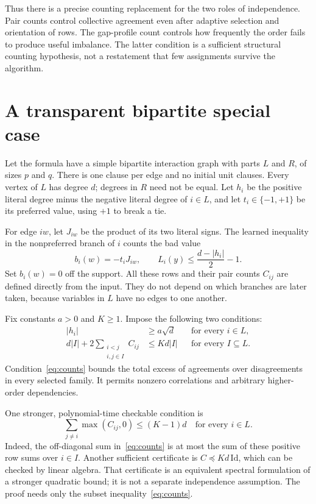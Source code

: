 \documentclass[11pt,a4paper]{article}
\begin{document}
Thus there is a precise counting replacement for the two roles of
independence. Pair counts control collective agreement even after
adaptive selection and orientation of rows. The gap-profile count
controls how frequently the order fails to produce useful imbalance.
The latter condition is a sufficient structural counting hypothesis,
not a restatement that few assignments survive the algorithm.

\section{A transparent bipartite special case}

Let the formula have a simple bipartite interaction graph with parts
$L$ and $R$, of sizes $p$ and $q$. There is one clause per edge and no
initial unit clauses. Every vertex of $L$ has degree $d$; degrees in
$R$ need not be equal. Let $h_i$ be the positive literal degree minus
the negative literal degree of $i\in L$, and let $t_i\in\{-1,+1\}$
be its preferred value, using $+1$ to break a tie.

For edge $iw$, let $J_{iw}$ be the product of its two literal signs.
The learned inequality in the nonpreferred branch of $i$ counts the
bad value
\begin{equation}
 b_i(w)=-t_iJ_{iw},\qquad
 L_i(y)\le\frac{d-|h_i|}{2}-1.                       \label{eq:learn}
\end{equation}
Set $b_i(w)=0$ off the support. All these rows and their pair counts
$C_{ij}$ are defined directly from the input. They do not depend on
which branches are later taken, because variables in $L$ have no edges
to one another.

Fix constants $a>0$ and $K\ge1$. Impose the following two conditions:
\begin{align}
 |h_i|&\ge a\sqrt d &&\text{for every }i\in L,       \label{eq:gap}\\
 d|I|+2\sum_{\substack{i<j\\i,j\in I}}C_{ij}
      &\le Kd|I| &&\text{for every }I\subseteq L.   \label{eq:counts}
\end{align}
Condition~\eqref{eq:counts} bounds the total excess of agreements over
disagreements in every selected family. It permits nonzero correlations
and arbitrary higher-order dependencies.

One stronger, polynomial-time checkable condition is
\begin{equation}
 \sum_{j\ne i}\max(C_{ij},0)\le(K-1)d
       \quad\text{for every }i\in L.               \label{eq:rowsum}
\end{equation}
Indeed, the off-diagonal sum in~\eqref{eq:counts} is at most the sum of
these positive row sums over $i\in I$. Another sufficient certificate is
$C\preceq Kd\,\mathrm{Id}$, which can be checked by linear algebra.
That certificate is an equivalent spectral formulation of a stronger
quadratic bound; it is not a separate independence assumption. The
proof needs only the subset inequality~\eqref{eq:counts}.
\end{document}
